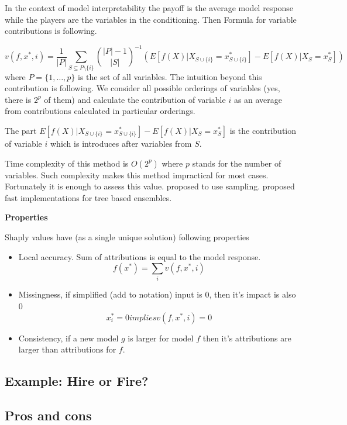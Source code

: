 \documentclass[]{krantz}
\providecommand{\tightlist}{%
  \setlength{\itemsep}{0pt}\setlength{\parskip}{0pt}}
\theoremstyle{definition}
\theoremstyle{definition}
\theoremstyle{definition}
\theoremstyle{remark}
\begin{document}
In the context of model interpretability the payoff is the average model
response while the players are the variables in the conditioning. Then
Formula for variable contributions is following.

\[
v(f, x^*, i) = \frac 1{|P|}\sum_{S \subseteq P\setminus \{i\}}  {{|P|-1}\choose{|S|}}^{-1} \left(E [f(X) | X_{S \cup \{i\}} = x^*_{S \cup \{i\}}] - E [f(X) | X_{S} = x^*_{S}]\right)
\] where \(P = \{1, \ldots, p\}\) is the set of all variables. The
intuition beyond this contribution is following. We consider all
possible orderings of variables (yes, there is \(2^p\) of them) and
calculate the contribution of variable \(i\) as an average from
contributions calculated in particular orderings.

The part
\(E[f(X) | X_{S \cup \{i\}} = x^*_{S \cup \{i\}}] - E [f(X) | X_{S} = x^*_{S}]\)
is the contribution of variable \(i\) which is introduces after
variables from \(S\).

Time complexity of this method is \(O(2^p)\) where \(p\) stands for the
number of variables. Such complexity makes this method impractical for
most cases. Fortunately it is enough to assess this value.
\citep{Strumbelj2014} proposed to use sampling. \citep{TreeSHAP}
proposed fast implementations for tree based ensembles.

\textbf{Properties}

Shaply values have (as a single unique solution) following properties

\begin{itemize}
\tightlist
\item
  Local accuracy. Sum of attributions is equal to the model response. \[
  f(x^*) = \sum_{i}   v(f, x^*, i) 
  \]
\item
  Missingness, if simplified (add to notation) input is 0, then it's
  impact is also 0 \[
  x_i^* = 0 implies   v(f, x^*, i) = 0
  \]
\item
  Consistency, if a new model \(g\) is larger for model \(f\) then it's
  attributions are larger than attributions for \(f\).
\end{itemize}

\hypertarget{example-hire-or-fire-2}{%
\subsection{Example: Hire or Fire?}\label{example-hire-or-fire-2}}

\hypertarget{pros-and-cons-4}{%
\subsection{Pros and cons}\label{pros-and-cons-4}}
\end{document}
